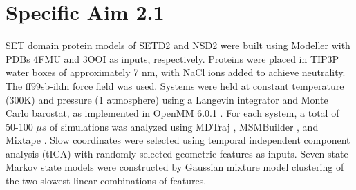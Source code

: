 \documentclass[12pt]{article}
\begin{document}
\section{Specific Aim 2.1}

SET domain protein models of SETD2 and NSD2 were built using Modeller with PDBs 4FMU and 3OOI as inputs, respectively.  Proteins were placed in TIP3P water boxes of approximately 7 nm, with NaCl ions added to achieve neutrality.  The ff99sb-ildn force field \cite{} was used.  Systems were held at constant temperature (300K) and pressure (1 atmosphere) using a Langevin integrator and Monte Carlo barostat, as implemented in OpenMM 6.0.1 \cite{}.  For each system, a total of 50-100 $\mu s$ of simulations was analyzed using MDTraj \cite{}, MSMBuilder \cite{}, and Mixtape \cite{}.  Slow coordinates were selected using temporal independent component analysis (tICA) \cite{} with randomly selected geometric features as inputs.  Seven-state Markov state models were constructed by Gaussian mixture model clustering of the two slowest linear combinations of features.
\end{document}
